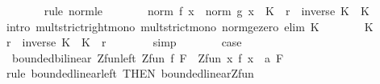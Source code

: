 \begin{isabellebody}
\ \ \ \ \ \ \isamarkupfalse%
\ {\isacharparenleft}{\kern0pt}rule\ norm{\isacharunderscore}{\kern0pt}le{\isacharparenright}{\kern0pt}\isanewline
\ \ \ \ \isamarkupfalse%
\ \isamarkupfalse%
\ {\isachardoublequoteopen}norm\ {\isacharparenleft}{\kern0pt}f\ x{\isacharparenright}{\kern0pt}\ {\isacharasterisk}{\kern0pt}\ norm\ {\isacharparenleft}{\kern0pt}g\ x{\isacharparenright}{\kern0pt}\ {\isacharasterisk}{\kern0pt}\ K\ {\isacharless}{\kern0pt}\ r\ {\isacharasterisk}{\kern0pt}\ inverse\ K\ {\isacharasterisk}{\kern0pt}\ K{\isachardoublequoteclose}\isanewline
\ \ \ \ \ \ \isamarkupfalse%
\ {\isacharparenleft}{\kern0pt}intro\ mult{\isacharunderscore}{\kern0pt}strict{\isacharunderscore}{\kern0pt}right{\isacharunderscore}{\kern0pt}mono\ mult{\isacharunderscore}{\kern0pt}strict{\isacharunderscore}{\kern0pt}mono{\isacharprime}{\kern0pt}\ norm{\isacharunderscore}{\kern0pt}ge{\isacharunderscore}{\kern0pt}zero\ elim\ K{\isacharparenright}{\kern0pt}\isanewline
\ \ \ \ \isamarkupfalse%
\ \isamarkupfalse%
\ K\ \isamarkupfalse%
\ {\isachardoublequoteopen}r\ {\isacharasterisk}{\kern0pt}\ inverse\ K\ {\isacharasterisk}{\kern0pt}\ K\ {\isacharequal}{\kern0pt}\ r{\isachardoublequoteclose}\isanewline
\ \ \ \ \ \ \isamarkupfalse%
\ simp\isanewline
\ \ \ \ \isamarkupfalse%
\ \isamarkupfalse%
\ {\isacharquery}{\kern0pt}case\ \isacommand{{\isachardot}{\kern0pt}}\isamarkupfalse%
\isanewline
\ \ \isamarkupfalse%
\isanewline
{}\isamarkupfalse%
%
\endisatagproof
{\isafoldproof}%
%
\isadelimproof
\isanewline
%
\endisadelimproof
\isanewline
{}\isamarkupfalse%
\ {\isacharparenleft}{\kern0pt}\ bounded{\isacharunderscore}{\kern0pt}bilinear{\isacharparenright}{\kern0pt}\ Zfun{\isacharunderscore}{\kern0pt}left{\isacharcolon}{\kern0pt}\ {\isachardoublequoteopen}Zfun\ f\ F\ {\isasymLongrightarrow}\ Zfun\ {\isacharparenleft}{\kern0pt}{\isasymlambda}x{\isachardot}{\kern0pt}\ f\ x\ {\isacharasterisk}{\kern0pt}{\isacharasterisk}{\kern0pt}\ a{\isacharparenright}{\kern0pt}\ F{\isachardoublequoteclose}\isanewline
%
\isadelimproof
\ \ %
\endisadelimproof
%
\isatagproof
{}\isamarkupfalse%
\ {\isacharparenleft}{\kern0pt}rule\ bounded{\isacharunderscore}{\kern0pt}linear{\isacharunderscore}{\kern0pt}left\ {\isacharbrackleft}{\kern0pt}THEN\ bounded{\isacharunderscore}{\kern0pt}linear{\isachardot}{\kern0pt}Zfun{\isacharbrackright}{\kern0pt}{\isacharparenright}{\kern0pt}%

\end{isabellebody}
